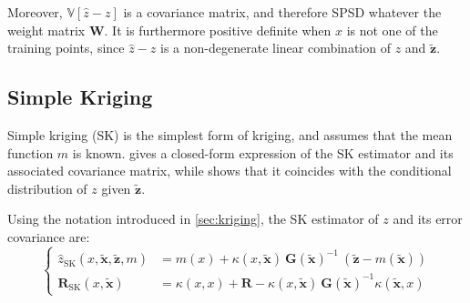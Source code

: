 Moreover, $\mathbb{V}\left[\hat{z}-z\right]$ is a covariance matrix, and therefore SPSD whatever the weight matrix $\mathbf{W}$. It is furthermore positive definite when $x$ is not one of the training points, since $\hat{z}-z$ is a non-degenerate linear combination of $z$ and $\tilde{\mathbf{z}}$.

\subsection{Simple Kriging}

Simple kriging (SK) is the simplest form of kriging, and assumes that the mean function $m$ is known.  gives a closed-form expression of the SK estimator and its associated covariance matrix, while  shows that it coincides with the conditional distribution of $z$ given $\tilde{\mathbf{z}}$.

\begin{proposition}\label{th:simple_kriging}
	Using the notation introduced in \cref{sec:kriging}, the SK estimator of $z$ and its error covariance are:
	\begin{equation}
		\left\{\begin{aligned}
		\hat{z}_{\mathrm{SK}}(x,\tilde{\mathbf{x}},\tilde{\mathbf{z}},m)&=m(x)+\kappa(x,\tilde{\mathbf{x}})\:\mathbf{G}(\tilde{\mathbf{x}})^{-1}\:(\tilde{\mathbf{z}}-m(\tilde{\mathbf{x}}))\\
		\mathbf{R}_{\mathrm{SK}}(x,\tilde{\mathbf{x}})&=\kappa(x,x)+\mathbf{R}-\kappa(x,\tilde{\mathbf{x}})\:\mathbf{G}(\tilde{\mathbf{x}})^{-1}\kappa\left(\tilde{\mathbf{x}},x\right)
		\end{aligned}\right.\label{eq:simple_kriging_equations}
	\end{equation}
\end{proposition}

